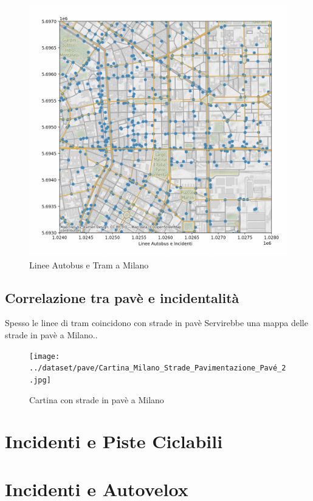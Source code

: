 \documentclass[a4paper]{report}
\begin{document}
\begin{figure}
    \includegraphics[width=\linewidth]{../src/atm/22_marzo.png}
    \caption{Linee Autobus e Tram a Milano}
    \label{fig:22-marzo}
\end{figure}


\subsection{Correlazione tra pavè e incidentalità}

Spesso le linee di tram coincidono con strade in pavè
Servirebbe una mappa delle strade in pavè a Milano..

\begin{figure}
    \texttt{[image: ../dataset/pave/Cartina\_Milano\_Strade\_Pavimentazione\_Pavé\_2.jpg]}
    \caption{Cartina con strade in pavè a Milano}
    \label{fig:pave-milano}
\end{figure}


\section{Incidenti e Piste  Ciclabili}

\section{Incidenti e Autovelox}
\end{document}
